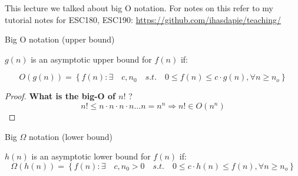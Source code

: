 \documentclass[../notes.tex]{subfiles}
\begin{document}
This lecture we talked about big O notation. For notes on this refer to my tutorial notes for ESC180, ESC190: \href{https://github.com/ihasdapie/teaching/}{https://github.com/ihasdapie/teaching/}


\begin{definition}
	Big O notation (upper bound)

	$ g(n) $  is an asymptotic upper bound for $ f(n) $ if:

	\begin{equation}
		O(g(n)) = \left\{f(n): \exists \quad c, n_0 \quad s.t. \quad 0 \le  f(n) \le  c\cdot g(n), \forall n \ge  n_o \right\}
		\label{eq:358:bigOh}
	\end{equation}
\end{definition}

\begin{proof}

	\textbf{What is the big-O of $ n! $ }?
	\begin{equation}
			n! \le n \cdot n \cdot n \cdot  n \ldots n = n^n \Rightarrow n! \in O(n^n) 
	\end{equation}
\end{proof}



\begin{definition}
	Big $ \Omega $  notation (lower bound)

	$ h(n) $  is an asymptotic lower bound for $ f(n) $ if:
	\begin{equation}
		\Omega(h(n)) =  \left\{f(n): \exists \quad {c, n_0} > 0 \quad s.t. \quad 0 \le c \cdot h(n) \le  f(n), \forall n \ge  n_o \right\}
		\label{eq:358:bigOmega}
	\end{equation}
\end{definition}
\end{document}
